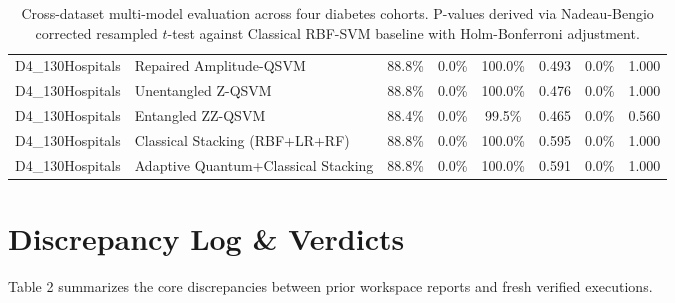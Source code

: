 \documentclass[10pt,twocolumn]{article}
\begin{document}
\begin{table}[t]
\begin{tabular}{llcccccc}
D4\_130Hospitals & Repaired Amplitude-QSVM & 88.8\% & 0.0\% & 100.0\% & 0.493 & 0.0\% & 1.000 \\
D4\_130Hospitals & Unentangled Z-QSVM & 88.8\% & 0.0\% & 100.0\% & 0.476 & 0.0\% & 1.000 \\
D4\_130Hospitals & Entangled ZZ-QSVM & 88.4\% & 0.0\% & 99.5\% & 0.465 & 0.0\% & 0.560 \\
D4\_130Hospitals & Classical Stacking (RBF+LR+RF) & 88.8\% & 0.0\% & 100.0\% & 0.595 & 0.0\% & 1.000 \\
D4\_130Hospitals & Adaptive Quantum+Classical Stacking & 88.8\% & 0.0\% & 100.0\% & 0.591 & 0.0\% & 1.000 \\
\bottomrule
\end{tabular}
\caption{Cross-dataset multi-model evaluation across four diabetes cohorts. P-values derived via Nadeau-Bengio corrected resampled $t$-test against Classical RBF-SVM baseline with Holm-Bonferroni adjustment.}
\end{table}

\section{Discrepancy Log & Verdicts}
Table 2 summarizes the core discrepancies between prior workspace reports and fresh verified executions.
\end{document}
